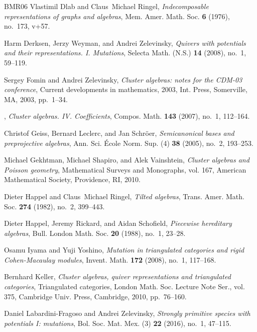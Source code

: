\documentclass[12pt]{amsart}
\begin{document}
\begin{thebibliography}{BMR{\etalchar{+}}06}
Vlastimil Dlab and Claus~Michael Ringel, \emph{Indecomposable representations
  of graphs and algebras}, Mem. Amer. Math. Soc. \textbf{6} (1976), no.~173,
  v+57. 

Harm Derksen, Jerzy Weyman, and Andrei Zelevinsky, \emph{Quivers with
  potentials and their representations. {I}. {M}utations}, Selecta Math. (N.S.)
  \textbf{14} (2008), no.~1, 59--119. 

Sergey Fomin and Andrei Zelevinsky, \emph{Cluster algebras: notes for the
  {CDM}-03 conference}, Current developments in mathematics, 2003, Int. Press,
  Somerville, MA, 2003, pp.~1--34. 

\bysame, \emph{Cluster algebras. {IV}. {C}oefficients}, Compos. Math.
  \textbf{143} (2007), no.~1, 112--164. 

Christof Geiss, Bernard Leclerc, and Jan Schr\"oer, \emph{Semicanonical bases
  and preprojective algebras}, Ann. Sci. \'Ecole Norm. Sup. (4) \textbf{38}
  (2005), no.~2, 193--253. 

Michael Gekhtman, Michael Shapiro, and Alek Vainshtein, \emph{Cluster algebras
  and {P}oisson geometry}, Mathematical Surveys and Monographs, vol. 167,
  American Mathematical Society, Providence, RI, 2010. 

Dieter Happel and Claus~Michael Ringel, \emph{Tilted algebras}, Trans. Amer.
  Math. Soc. \textbf{274} (1982), no.~2, 399--443. 

Dieter Happel, Jeremy Rickard, and Aidan Schofield, \emph{Piecewise hereditary
  algebras}, Bull. London Math. Soc. \textbf{20} (1988), no.~1, 23--28.

Osamu Iyama and Yuji Yoshino, \emph{Mutation in triangulated categories and
  rigid {C}ohen-{M}acaulay modules}, Invent. Math. \textbf{172} (2008), no.~1,
  117--168. 

Bernhard Keller, \emph{Cluster algebras, quiver representations and
  triangulated categories}, Triangulated categories, London Math. Soc. Lecture
  Note Ser., vol. 375, Cambridge Univ. Press, Cambridge, 2010, pp.~76--160.

Daniel Labardini-Fragoso and Andrei Zelevinsky, \emph{Strongly primitive
  species with potentials {I}: mutations}, Bol. Soc. Mat. Mex. (3) \textbf{22}
  (2016), no.~1, 47--115. 


\end{thebibliography}
\end{document}
